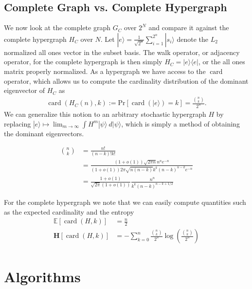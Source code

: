\documentclass{article}
\newcommand{\ket}[1]{|#1\rangle}
\newcommand{\ketbra}[2]{| #1\rangle\! \langle #2|}
\newcommand{\parens}[1]{\left( #1 \right)}
\newcommand{\brackets}[1]{\left[ #1 \right]}
\newcommand{\expect}[1]{\mathbb{E}\brackets{#1}}
\newcommand{\prob}[1]{\text{Pr}\left[ #1 \right]}
\DeclareMathOperator{\card}{card}
\newcommand{\cardi}[1]{\card \parens{ #1 }}
\begin{document}
\subsection{Complete Graph vs. Complete Hypergraph}
We now look at the complete graph $G_C$ over $2^N$ and compare it against the complete hypergraph $H_C$ over $N$. Let $\ket{e} = \frac{1}{\sqrt{2^n}} \sum_{i=1}^{2^n} \ket{s_i}$ denote the $L_2$ normalized all ones vector in the subset basis. The walk operator, or adjacency operator, for the complete hypergraph is then simply $H_C = \ketbra{e}{e}$, or the all ones matrix properly normalized. As a hypergraph we have access to the $\card$ operator, which allows us to compute the cardinality distribution of the dominant eigenvector of $H_C$ as
\begin{align}
    \cardi{H_C(n), k} := \prob{\cardi{\ket{e}} = k } = \frac{\binom{n}{k}}{2^n}.
\end{align}
We can generalize this notion to an arbitrary stochastic hypergraph $H$  by replacing $\ket{e} \mapsto \lim_{m \to \infty} \int H^m \ket{\psi} ~d\ket{\psi} $, which is simply a method of obtaining the dominant eigenvectors.


\begin{align}
    \binom{n}{k} &= \frac{n!}{(n-k)! k!} \\
    &= \frac{(1 + o(1))\sqrt{2 \pi n} n^n e^{-n}}{(1+o(1)) 2 \pi \sqrt{n (n-k)} k^k (n-k)^{n-k} e^{-n}} \\
    &= \frac{1 + o(1)}{\sqrt{2 \pi}(1+o(1))} \frac{n^n}{ k^k (n-k)^{n-k + 1/2}}
\end{align}

For the complete hypergraph we note that we can easily compute quantities such as the expected cardinality and the entropy
\begin{align}
    \expect{\cardi{H, k}} &= \frac{n}{2} \\
    \mathbf{H} \brackets{\cardi{H, k}} &= - \sum_{k=0}^{n} \frac{\binom{n}{k}}{2^n} \log \parens{\frac{\binom{n}{k}}{2^n}}\\
\end{align}

\section{Algorithms} \label{sec:algorithms}
\end{document}
